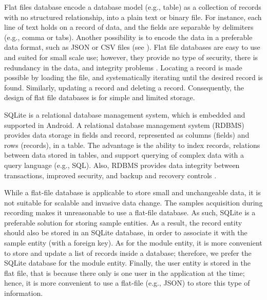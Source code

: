 Flat files database encode a database model (e.g., table) as a collection of records with no structured relationship, into a plain text or binary file. For instance, each line of text holds on a record of data, and the fields are separable by delimiters (e.g., comma or tabs). Another possibility is to encode the data in a preferable data format, such as JSON or CSV files (see ). Flat file databases are easy to use and suited for small scale use; however, they provide no type of security, there is redundancy in the data, and integrity problems \cite{flatfilerdbms}. Locating a record is made possible by loading the file, and systematically iterating until the desired record is found. Similarly, updating a record and deleting a record. Consequently, the design of flat file databases is for simple and limited storage.

SQLite is a relational database management system, which is embedded and supported in Android. A relational database management system (RDBMS) provides data storage in fields and record, represented as columns (fields) and rows (records), in a table. The advantage is the ability to index records, relations between data stored in tables, and support querying of complex data with a query language (e.g., SQL). Also, RDBMS provides data integrity between transactions, improved security, and backup and recovery controls \cite{flatfilerdbms}. 

While a flat-file database is applicable to store small and unchangeable data, it is not suitable for scalable and invasive data change. The samples acquisition during recording makes it unreasonable to use a flat-file database. As such, SQLite is a preferable solution for storing sample entities. As a result, the record entity should also be stored in an SQLite database, in order to associate it with the sample entity (with a foreign key). As for the module entity, it is more convenient to store and update a list of records inside a database; therefore, we prefer the SQLite database for the module entity. Finally, the user entity is stored in the flat file, that is because there only is one user in the application at the time; hence, it is more convenient to use a flat-file (e.g., JSON) to store this type of information.

